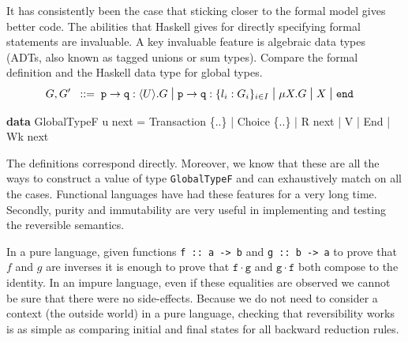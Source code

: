 \documentclass[runningheads,plain]{llncs}
\newcommand{\modi}[1]{\textcolor{blue}{#1}}
\newenvironment{Shaded}{}{}
\newcommand{\KeywordTok}[1]{\textcolor[rgb]{0.00,0.44,0.13}{\textbf{#1}}}
\newcommand{\DataTypeTok}[1]{\textcolor[rgb]{0.56,0.13,0.00}{#1}}
\newcommand{\FunctionTok}[1]{\textcolor[rgb]{0.02,0.16,0.49}{#1}}
\newcommand{\NormalTok}[1]{#1}
\begin{document}
It has consistently been the case that sticking closer to the formal
model gives better code. The abilities that Haskell gives for directly
specifying formal statements are invaluable. A key invaluable
feature is algebraic data types (ADTs, also known as tagged unions or
sum types). Compare the formal definition and the Haskell data type for global
types.
\begin{align*}
    G, G'  \bnfis & \gtcom{p}{q}{U}{G} %
    \sbnfbar
    \gtcho{p}{q}{\lbl_i}{G_i} %
    \sbnfbar %
    \mu X. G \sbnfbar X \sbnfbar \gend 
\end{align*}
\begin{Shaded}
\begin{Highlighting}[]
\KeywordTok{data} \DataTypeTok{GlobalTypeF}\NormalTok{ u next }\FunctionTok{=} 
    \DataTypeTok{Transaction}\NormalTok{ \{}\FunctionTok{..}\NormalTok{\} }\FunctionTok{|} \DataTypeTok{Choice}\NormalTok{ \{}\FunctionTok{..}\NormalTok{\}  }\FunctionTok{|} \DataTypeTok{R}\NormalTok{ next }\FunctionTok{|} \DataTypeTok{V} \FunctionTok{|} \DataTypeTok{End} \FunctionTok{|} \DataTypeTok{Wk}\NormalTok{ next}
\end{Highlighting}
\end{Shaded}

The definitions correspond directly. Moreover, we know that these are
all the ways to construct a value of type \texttt{GlobalTypeF} and can
exhaustively match on all the cases. Functional languages have had these
features for a very long time. 
Secondly, purity and immutability are very useful in implementing and
testing the reversible semantics. 

In a pure language, given functions
\texttt{f\ ::\ a\ -\textgreater{}\ b} and
\texttt{g\ ::\ b\ -\textgreater{}\ a} to prove that \(f\) and \(g\) are
inverses it is enough to prove 
that
$\mathtt{f} \cdot \mathtt{g}$ and  $\mathtt{g} \cdot \mathtt{f}$ both compose to the identity.
In an impure language, even if these equalities are observed we
cannot be sure that there were no side-effects. Because we do not need
to consider a context (the outside world) in a pure language, checking that
reversibility works is as simple as comparing initial and final states
for all backward reduction rules.
\end{document}
